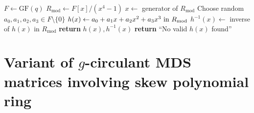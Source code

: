 \documentclass[12pt]{article}
\begin{document}
\begin{algorithm}
	\caption{: Invertible polynomials of  Weight-4 in $\mathbb{F}_q[x]/(x^4 - 1)$}
	\small{
		\begin{algorithmic}[1]
			\State $F \gets \text{GF}(q)$
			\State $R_{\text{mod}} \gets F[x]/(x^4 - 1)$
			\State $x \gets$ generator of $R_{\text{mod}}$
			\State Choose random $a_0, a_1, a_2, a_3 \in F \setminus \{0\}$
			\State $h(x) \gets a_0 + a_1 x + a_2 x^2 + a_3 x^3 \textup{ in } R_{\text{mod}}$
			\State $h^{-1}(x) \gets$ inverse of $h(x)$ in $R_{\text{mod}}$
			\State \textbf{return} $h(x), h^{-1}(x)$
			\EndIf
			\EndIf
			\EndFor
			\State \textbf{return} ``No valid $h(x)$ found''
			\EndProcedure
		\end{algorithmic}
	}
\end{algorithm}
\section{Variant of \(g\)-circulant MDS matrices involving skew polynomial ring}
\end{document}
